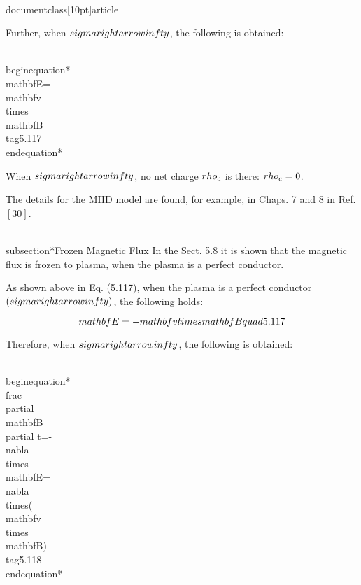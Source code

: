 \\documentclass[10pt]{article}
\begin{document}
{{{{Further, when $\\sigma \\rightarrow \\infty$, the following is obtained:


\\begin{equation*}
\\mathbf{E}=-\\mathbf{v} \\times \\mathbf{B} \\tag{5.117}
\\end{equation*}


When $\\sigma \\rightarrow \\infty$, no net charge $\\rho_{c}$ is there: $\\rho_{c}=0$.

The details for the MHD model are found, for example, in Chaps. 7 and 8 in Ref. $[30]$.

\\subsection*{Frozen Magnetic Flux}
In the Sect. 5.8 it is shown that the magnetic flux is frozen to plasma, when the plasma is a perfect conductor.

As shown above in Eq. (5.117), when the plasma is a perfect conductor $(\\sigma \\rightarrow \\infty)$, the following holds:

$$
\\mathbf{E}=-\\mathbf{v} \\times \\mathbf{B} \\quad 5.117
$$

Therefore, when $\\sigma \\rightarrow \\infty$, the following is obtained:


\\begin{equation*}
\\frac{\\partial \\mathbf{B}}{\\partial t}=-\\nabla \\times \\mathbf{E}=\\nabla \\times(\\mathbf{v} \\times \\mathbf{B}) \\tag{5.118}
\\end{equation*}


}}}}
\end{document}
